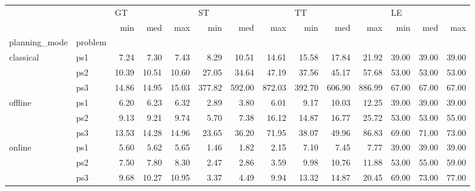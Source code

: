 \begin{tabular}{llrrrrrrrrrrrr}
\toprule
       &     & \multicolumn{3}{l}{GT} & \multicolumn{3}{l}{ST} & \multicolumn{3}{l}{TT} & \multicolumn{3}{l}{LE} \\
       &     &   min &   med &   max &    min &    med &    max &    min &    med &    max &   min &   med &   max \\
planning\_mode & problem &       &       &       &        &        &        &        &        &        &       &       &       \\
\midrule
classical & ps1 &  7.24 &  7.30 &  7.43 &   8.29 &  10.51 &  14.61 &  15.58 &  17.84 &  21.92 & 39.00 & 39.00 & 39.00 \\
       & ps2 & 10.39 & 10.51 & 10.60 &  27.05 &  34.64 &  47.19 &  37.56 &  45.17 &  57.68 & 53.00 & 53.00 & 53.00 \\
       & ps3 & 14.86 & 14.95 & 15.03 & 377.82 & 592.00 & 872.03 & 392.70 & 606.90 & 886.99 & 67.00 & 67.00 & 67.00 \\
offline & ps1 &  6.20 &  6.23 &  6.32 &   2.89 &   3.80 &   6.01 &   9.17 &  10.03 &  12.25 & 39.00 & 39.00 & 39.00 \\
       & ps2 &  9.13 &  9.21 &  9.74 &   5.70 &   7.38 &  16.12 &  14.87 &  16.77 &  25.72 & 53.00 & 53.00 & 55.00 \\
       & ps3 & 13.53 & 14.28 & 14.96 &  23.65 &  36.20 &  71.95 &  38.07 &  49.96 &  86.83 & 69.00 & 71.00 & 73.00 \\
online & ps1 &  5.60 &  5.62 &  5.65 &   1.46 &   1.82 &   2.15 &   7.10 &   7.45 &   7.77 & 39.00 & 39.00 & 39.00 \\
       & ps2 &  7.50 &  7.80 &  8.30 &   2.47 &   2.86 &   3.59 &   9.98 &  10.76 &  11.88 & 53.00 & 55.00 & 59.00 \\
       & ps3 &  9.68 & 10.27 & 10.95 &   3.37 &   4.49 &   9.94 &  13.32 &  14.87 &  20.45 & 69.00 & 73.00 & 77.00 \\
\bottomrule
\end{tabular}
